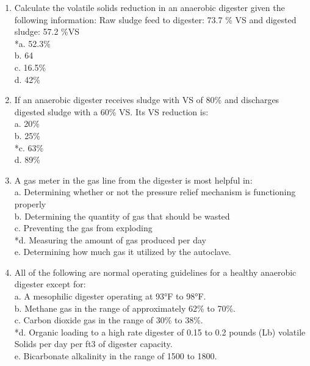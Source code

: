 \documentclass{article}
\begin{document}
\begin{enumerate}
\item  Calculate the volatile solids reduction in an anaerobic digester given the following information:  Raw sludge feed to digester:  73.7 \% VS and digested sludge: 57.2 \%VS \\

*a. 52.3\% \\
b. 64 \\
c. 16.5\% \\
d. 42\% \\

\item  If an anaerobic digester receives sludge with VS of 80\% and discharges digested sludge with a 60\% VS.  Its VS reduction is: \\

a. 20\% \\
b. 25\% \\
*c. 63\% \\
d. 89\% \\

\item  A gas meter in the gas line from the digester is most helpful in: \\

a. Determining whether or not the pressure relief mechanism is functioning properly \\
b. Determining the quantity of gas that should be wasted \\
c. Preventing the gas from exploding \\
*d. Measuring the amount of gas produced per day \\
e. Determining how much gas it utilized by the autoclave. \\

\item  All of the following are normal operating guidelines for a healthy anaerobic digester except for: \\

a. A mesophilic digester operating at 93°F to 98°F. \\
b. Methane gas in the range of approximately 62\% to 70\%. \\
c. Carbon dioxide gas in the range of 30\% to 38\%. \\
*d. Organic loading to a high rate digester of 0.15 to 0.2 pounds (Lb) volatile Solids per day per ft3 of digester capacity. \\
e. Bicarbonate alkalinity in the range of 1500 to 1800. \\


\end{enumerate}
\end{document}
